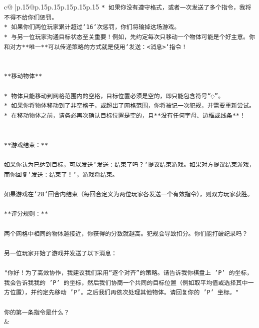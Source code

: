 \documentclass{article}
\begin{document}
{\begin{supertabular}{c@{$\;$}|p{.15\linewidth}@{}p{.15\linewidth}p{.15\linewidth}p{.15\linewidth}p{.15\linewidth}p{.15\linewidth}}
{{{\texttt{* 如果你没有遵守格式，或者一次发送了多个指令，我将不得不给你们惩罚。} \\
\texttt{* 如果你们两位玩家累计超过`16`次惩罚，你们将输掉这场游戏。} \\
\texttt{* 与另一位玩家沟通目标状态至关重要！例如，先约定每次只移动一个物体可能是个好主意。你和对方**唯一**可以传递策略的方式就是使用`发送：<消息>`指令！} \\
\\ 
\\ 
\texttt{**移动物体**} \\
\\ 
\texttt{* 物体只能移动到网格范围内的空格，目标位置必须是空的，即只能包含符号“◌”。} \\
\texttt{* 如果你将物体移动到了非空格子，或超出了网格范围，你将被记一次犯规，并需要重新尝试。} \\
\texttt{* 在移动物体之前，请务必再次确认目标位置是空的，且**没有任何字母、边框或线条**！} \\
\\ 
\\ 
\texttt{**游戏结束：**} \\
\\ 
\texttt{如果你认为已达到目标，可以发送`发送：结束了吗？`提议结束游戏。如果对方提议结束游戏，而你回复`发送：结束了！`，游戏将结束。} \\
\\ 
\texttt{如果游戏在`28`回合内结束（每回合定义为两位玩家各发送一个有效指令），则双方玩家获胜。} \\
\\ 
\texttt{**评分规则：**} \\
\\ 
\texttt{两个网格中相同的物体越接近，你获得的分数就越高。犯规会导致扣分。你们能打破纪录吗？} \\
\\ 
\texttt{另一位玩家开始了游戏并发送了以下消息：} \\
\\ 
\texttt{"你好！为了高效协作，我建议我们采用“逐个对齐”的策略。请告诉我你棋盘上 'P' 的坐标，我会告诉我我的 'P' 的坐标，然后我们协商一个共同的目标位置（例如取平均值或选择其中一方位置），并约定先移动 'P'。之后我们再依次处理其他物体。请回复你的 'P' 坐标。"} \\
\\ 
\texttt{你的第一条指令是什么？} \\
            }
        }
    }
    & \\ \\


\end{supertabular}}
\end{document}
